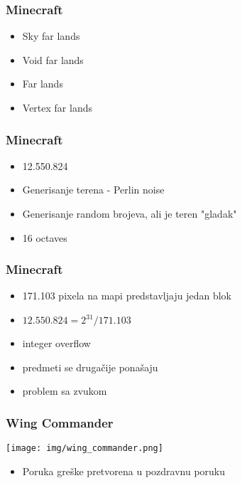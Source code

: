 \documentclass{beamer}
\begin{document}
\begin{frame}
    \frametitle{Minecraft}
    \begin{itemize}
        \item Sky far lands \newline
        \item Void far lands \newline
        \item Far lands \newline
        \item Vertex far lands \newline
    \end{itemize}
\end{frame}

\begin{frame}
    \frametitle{Minecraft}
    \begin{itemize}
        \item 12.550.824 \newline
        \item Generisanje terena - Perlin noise \newline
        \item Generisanje random brojeva, ali je teren "gladak" \newline
        \item 16 octaves
    \end{itemize}
\end{frame}

\begin{frame}
    \frametitle{Minecraft}
    \begin{itemize}
        \item 171.103 pixela na mapi predstavljaju jedan blok \newline
        \item $12.550.824 = 2^{31} / 171.103$ \newline
        \item integer overflow \newline
        \item predmeti se drugačije ponašaju \newline
        \item problem sa zvukom
    \end{itemize}
\end{frame}

\begin{frame}
    \frametitle{Wing Commander}
    \begin{center}
        \texttt{[image: img/wing\_commander.png]}
    \end{center}
    \begin{itemize}
        \item Poruka greške pretvorena u pozdravnu poruku
    \end{itemize}
\end{frame}
\end{document}
